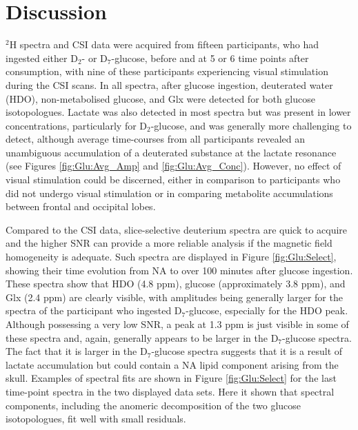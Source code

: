\section{Discussion}

$^2$H spectra and \ac{CSI} data were acquired from fifteen participants, who had ingested either D$_2$- or D$_7$-glucose, before and at 5 or 6 time points after consumption, with nine of these participants experiencing visual stimulation during the \ac{CSI} scans. In all spectra, after glucose ingestion, deuterated water (\ac{HDO}), non-metabolised glucose, and Glx were detected for both glucose isotopologues. Lactate was also detected in most spectra but was present in lower concentrations, particularly for D$_2$-glucose, and was generally more challenging to detect, although average time-courses from all participants revealed an unambiguous accumulation of a deuterated substance at the lactate resonance (see Figures \ref{fig:Glu:Avg_Amp} and \ref{fig:Glu:Avg_Conc}). However, no effect of visual stimulation could be discerned, either in comparison to participants who did not undergo visual stimulation or in comparing metabolite accumulations between frontal and occipital lobes.

 Compared to the \ac{CSI} data, slice-selective deuterium spectra are quick to acquire and the higher \ac{SNR} can provide a more reliable analysis if the magnetic field homogeneity is adequate. Such spectra are displayed in Figure \ref{fig:Glu:Select}, showing their time evolution from \ac{NA} to over 100 minutes after glucose ingestion. These spectra show that HDO (4.8 ppm), glucose (approximately 3.8 ppm), and Glx (2.4 ppm) are clearly visible, with amplitudes being generally larger for the spectra of the participant who ingested D$_7$-glucose, especially for the \ac{HDO} peak. Although possessing a very low \ac{SNR}, a peak at 1.3 ppm is just visible in some of these spectra and, again, generally appears to be larger in the D$_7$-glucose spectra. The fact that it is larger in the D$_7$-glucose spectra suggests that it is a result of lactate accumulation but could contain a \ac{NA} lipid component arising from the skull. Examples of spectral fits are shown in Figure \ref{fig:Glu:Select} for the last time-point spectra in the two displayed data sets. Here it shown that spectral components, including the anomeric decomposition of the two glucose isotopologues, fit well with small residuals.

